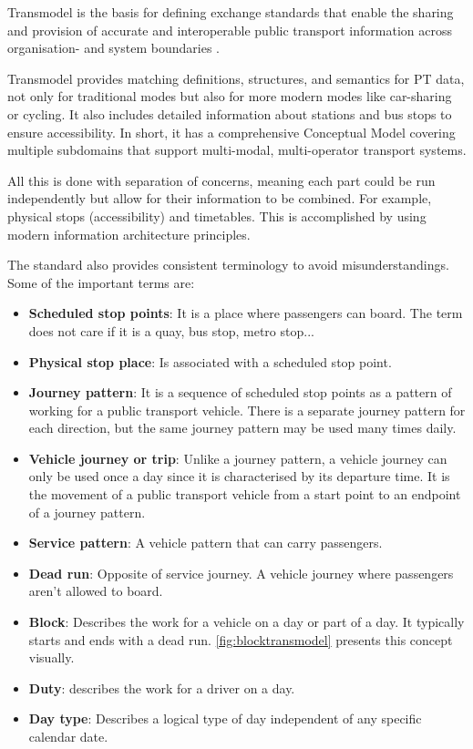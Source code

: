 Transmodel is the basis for defining exchange standards that enable the sharing and provision of accurate and interoperable public transport information across organisation- and system boundaries \cite{noauthor_transmodel_nodate}.

Transmodel provides matching definitions, structures, and semantics for PT data, not only for traditional modes but also for more modern modes like car-sharing or cycling. It also includes detailed information about stations and bus stops to ensure accessibility. In short, it has a comprehensive Conceptual Model covering multiple subdomains that support multi-modal, multi-operator transport systems.

All this is done with separation of concerns, meaning each part could be run independently but allow for their information to be combined. For example, physical stops (accessibility) and timetables. This is accomplished by using modern information architecture principles.

The standard also provides consistent terminology to avoid misunderstandings. Some of the important terms are:
\begin{itemize}
    \item \textbf{Scheduled stop points}: It is a place where passengers can board. The term does not care if it is a quay, bus stop, metro stop...
    \item \textbf{Physical stop place}: Is associated with a scheduled stop point.
    \item \textbf{Journey pattern}: It is a sequence of scheduled stop points as a pattern of working for a public transport vehicle. There is a separate journey pattern for each direction, but the same journey pattern may be used many times daily.
    \item \textbf{Vehicle journey or trip}: Unlike a journey pattern, a vehicle journey can only be used once a day since it is characterised by its departure time. It is the movement of a public transport vehicle from a start point to an endpoint of a journey pattern.
    \item \textbf{Service pattern}: A vehicle pattern that can carry passengers.
    \item \textbf{Dead run}: Opposite of service journey. A vehicle journey where passengers aren’t allowed to board. 
    \item \textbf{Block}: Describes the work for a vehicle on a day or part of a day. It typically starts and ends with a dead run. \autoref{fig:blocktransmodel} presents this concept visually.
    \item \textbf{Duty}: describes the work for a driver on a day. 
    \item \textbf{Day type}: Describes a logical type of day independent of any specific calendar date. 
\end{itemize}

